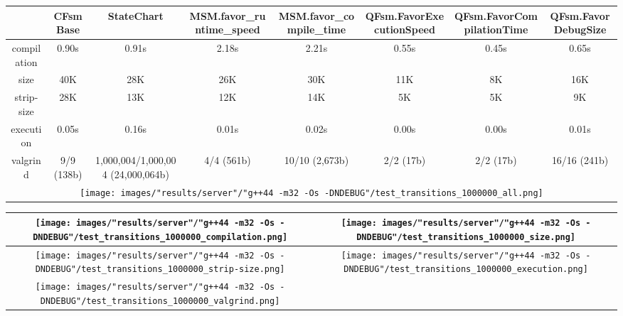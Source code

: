 \begin{landscape}
\begin{table}
\caption{"server" [54c084f], g++44 -m32 -Os -DNDEBUG/test transitions 1000000}
\centering
\begin{longtable}{| c | c |c |c |c |c |c |c |}
\hline
& CFsmBase& StateChart& MSM.favor\_runtime\_speed& MSM.favor\_compile\_time& QFsm.FavorExecutionSpeed& QFsm.FavorCompilationTime& QFsm.FavorDebugSize\\
\hline
compilation & 0.90s & 0.91s & 2.18s & 2.21s & 0.55s & 0.45s & 0.65s\\
\hline
size & 40K & 28K & 26K & 30K & 11K & 8K & 16K\\
\hline
strip-size & 28K & 13K & 12K & 14K & 5K & 5K & 9K\\
\hline
execution & 0.05s & 0.16s & 0.01s & 0.02s & 0.00s & 0.00s & 0.01s\\
\hline
valgrind & 9/9 (138b) & 1,000,004/1,000,004 (24,000,064b) & 4/4 (561b) & 10/10 (2,673b) & 2/2 (17b) & 2/2 (17b) & 16/16 (241b)\\
\hline
\multicolumn{8}{|c|}{\texttt{[image: images/"results/server"/"g++44 -m32 -Os -DNDEBUG"/test\_transitions\_1000000\_all.png]}}\\
\hline
\end{longtable}
\end{table}
\end{landscape}
\newpage
\begin{table}
\centering
\begin{longtable}{| c | c |}
\hline
\texttt{[image: images/"results/server"/"g++44 -m32 -Os -DNDEBUG"/test\_transitions\_1000000\_compilation.png]}& \texttt{[image: images/"results/server"/"g++44 -m32 -Os -DNDEBUG"/test\_transitions\_1000000\_size.png]}\\
\hline
\texttt{[image: images/"results/server"/"g++44 -m32 -Os -DNDEBUG"/test\_transitions\_1000000\_strip-size.png]}& \texttt{[image: images/"results/server"/"g++44 -m32 -Os -DNDEBUG"/test\_transitions\_1000000\_execution.png]}\\
\hline
\texttt{[image: images/"results/server"/"g++44 -m32 -Os -DNDEBUG"/test\_transitions\_1000000\_valgrind.png]}& \\ \hline
\end{longtable}
\end{table}
